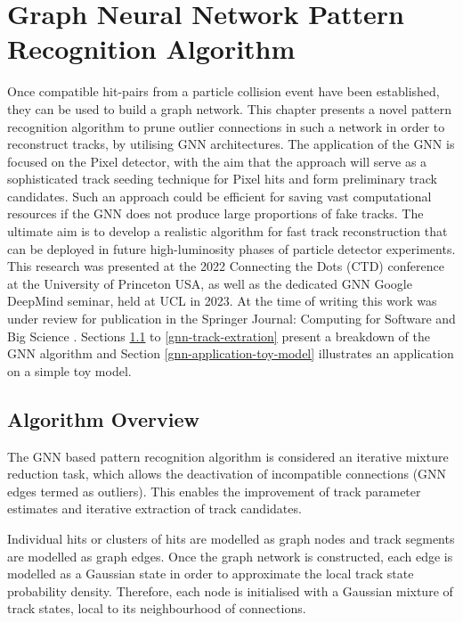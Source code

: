 
\chapter{Graph Neural Network Pattern Recognition Algorithm}\label{chapter-5}

Once compatible hit-pairs from a particle collision event have been established, they can be used to build a graph network. This chapter presents a novel pattern recognition algorithm to prune outlier connections in such a network in order to reconstruct tracks, by utilising GNN architectures. The application of the GNN is focused on the Pixel detector, with the aim that the approach will serve as a sophisticated track seeding technique for Pixel hits and form preliminary track candidates. Such an approach could be efficient for saving vast computational resources if the GNN does not produce large proportions of fake tracks. The ultimate aim is to develop a realistic algorithm for fast track reconstruction that can be deployed in future high-luminosity phases of particle detector experiments. This research was presented at the 2022 Connecting the Dots (CTD) conference at the University of Princeton USA, as well as the dedicated GNN Google DeepMind seminar, held at UCL in 2023. At the time of writing this work was under review for publication in the Springer Journal: Computing for Software and Big Science \cite{Lad_2023_gnn}. Sections \ref{gnn-algorithm-overview} to \ref{gnn-track-extration} present a breakdown of the GNN algorithm and Section \ref{gnn-application-toy-model} illustrates an application on a simple toy model.


\section{Algorithm Overview}
\label{gnn-algorithm-overview}
The GNN based pattern recognition algorithm is considered an iterative mixture reduction task, which allows the deactivation of incompatible connections (GNN edges termed as outliers). This enables the improvement of track parameter estimates and iterative extraction of track candidates. 

Individual hits or clusters of hits are modelled as graph nodes and track segments are modelled as graph edges. Once the graph network is constructed, each edge is modelled as a Gaussian state in order to approximate the local track state probability density. Therefore, each node is initialised with a Gaussian mixture of track states, local to its neighbourhood of connections.

